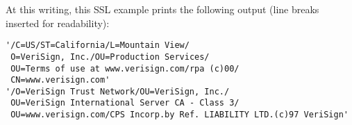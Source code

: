 At this writing, this SSL example prints the following output (line
breaks inserted for readability):

\begin{verbatim}
'/C=US/ST=California/L=Mountain View/
 O=VeriSign, Inc./OU=Production Services/
 OU=Terms of use at www.verisign.com/rpa (c)00/
 CN=www.verisign.com'
'/O=VeriSign Trust Network/OU=VeriSign, Inc./
 OU=VeriSign International Server CA - Class 3/
 OU=www.verisign.com/CPS Incorp.by Ref. LIABILITY LTD.(c)97 VeriSign'
\end{verbatim}

